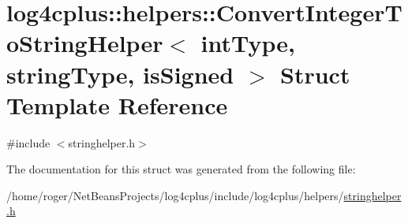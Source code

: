 \hypertarget{structlog4cplus_1_1helpers_1_1ConvertIntegerToStringHelper}{\section{log4cplus\-:\-:helpers\-:\-:Convert\-Integer\-To\-String\-Helper$<$ int\-Type, string\-Type, is\-Signed $>$ Struct Template Reference}
\label{structlog4cplus_1_1helpers_1_1ConvertIntegerToStringHelper}
}


{\ttfamily \#include $<$stringhelper.\-h$>$}



The documentation for this struct was generated from the following file\-:\begin{DoxyCompactItemize}
\item 
/home/roger/\-Net\-Beans\-Projects/log4cplus/include/log4cplus/helpers/\hyperlink{stringhelper_8h}{stringhelper.\-h}\end{DoxyCompactItemize}
